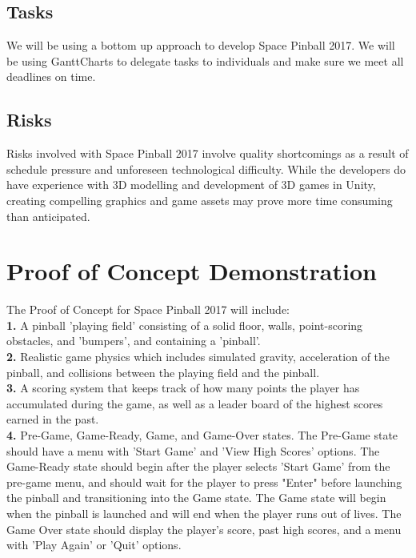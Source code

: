 \documentclass[12pt]{article}
\begin{document}
\subsection{Tasks} 
We will be using a bottom up approach to develop Space Pinball 2017. We will be using GanttCharts to delegate tasks to individuals and make sure we meet all deadlines on time. 

\subsection{Risks}
Risks involved with Space Pinball 2017 involve quality shortcomings as a result of schedule pressure and unforeseen technological difficulty. While the developers do have experience with 3D modelling and development of 3D games in Unity, creating compelling graphics and game assets may prove more time consuming than anticipated.

	
\section{Proof of Concept Demonstration}


The Proof of Concept for Space Pinball 2017 will include: \\

\textbf{1.} A pinball 'playing field' consisting of a solid floor, walls, point-scoring obstacles, and 'bumpers', and containing a 'pinball'. \\

\textbf{2.} Realistic game physics which includes simulated gravity, acceleration of the pinball, and collisions between the playing field and the pinball. \\

\textbf{3.} A scoring system that keeps track of how many points the player has accumulated during the game, as well as a leader board of the highest scores earned in the past. \\

\textbf{4.} Pre-Game, Game-Ready, Game, and Game-Over states. The Pre-Game state should have a menu with 'Start Game' and 'View High Scores' options. The Game-Ready state should begin after the player selects 'Start Game' from the pre-game menu, and should wait for the player to press "Enter" before launching the pinball and transitioning into the Game state. The Game state will begin when the pinball is launched and will end when the player runs out of lives. The Game Over state should display the player's score, past high scores, and a menu with 'Play Again' or 'Quit' options. \\
\end{document}
